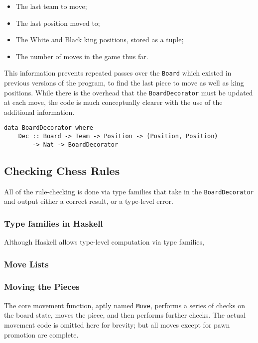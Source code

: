 \documentclass[12pt, a4paper]{scrartcl}
\begin{document}
\begin{itemize}
    \item The last team to move;
    \item The last position moved to;
    \item The White and Black king positions, stored as a tuple;
    \item The number of moves in the game thus far.
\end{itemize}

This information prevents repeated passes over the \lstinline{Board} which existed in previous versions of the program, to find the last piece to move as well as king positions. While there is the overhead that the \lstinline{BoardDecorator} must be updated at each move, the code is much conceptually clearer with the use of the additional information.

\begin{lstlisting}
data BoardDecorator where
    Dec :: Board -> Team -> Position -> (Position, Position)
        -> Nat -> BoardDecorator
\end{lstlisting}

\subsection{Checking Chess Rules}

All of the rule-checking is done via type families that take in the \lstinline{BoardDecorator} and output either a correct result, or a type-level error.

\subsubsection{Type families in Haskell}

Although Haskell allows type-level computation via type families, 


\subsubsection{Move Lists}

\subsubsection{Moving the Pieces}

The core movement function, aptly named \lstinline{Move}, performs a series of checks on the board state, moves the piece, and then performs further checks. The actual movement code is omitted here for brevity; but all moves except for pawn promotion are complete.
\end{document}
